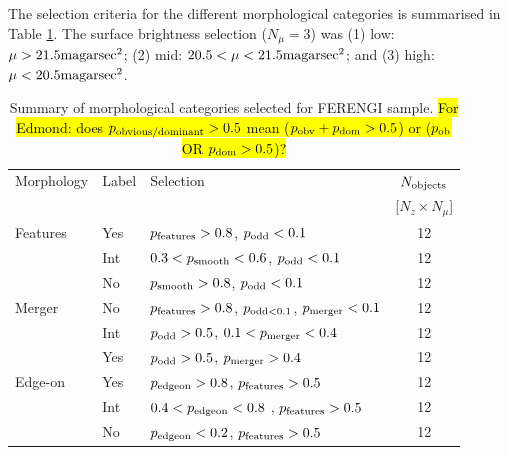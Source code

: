 \documentclass[usenatbib]{mn2e}
\begin{document}
 The selection criteria for the different morphological categories is summarised in Table \ref{morphologies}. The surface brightness selection ($N_\mu = 3$) was (1) low: $\mu > 21.5 {\rm mag arsec}^2$;  (2) mid: $20.5 < \mu < 21.5 {\rm mag arsec}^2$; and (3) high: $\mu < 20.5 {\rm mag arsec}^2$. 
 
\begin{table}
\caption{Summary of morphological categories selected for FERENGI sample. \hl{For Edmond: does $p_{\rm obvious/dominant}>0.5$ mean ($p_{\rm obv}+p_{\rm dom}>0.5$) or ($p_{\rm ob}$ OR $p_{\rm dom} >0.5$)?}\label{morphologies}}
\begin{tabular}{lllc}
\hline\hline
Morphology          & Label &  Selection                                                                                            & $N_{\rm objects}$ \\
                    &       &                                                                                                       & [$N_z \times N_\mu$] \\
\hline
Features            & Yes   & $p_{\rm features} > 0.8$, $p_{\rm odd} < 0.1$                                                         & 12 \\ 
                    & Int   & $0.3 < p_{\rm smooth} < 0.6$, $p_{\rm odd} < 0.1$                                                     & 12 \\ 
                    & No    & $p_{\rm smooth} > 0.8$, $p_{\rm odd} < 0.1$                                                           & 12 \\ 
Merger              & No    & $p_{\rm features} > 0.8$, $p_{\rm odd < 0.1}$, $p_{\rm merger} < 0.1$                                 & 12 \\
                    & Int   & $p_{\rm odd} > 0.5$, $0.1< p_{\rm merger} < 0.4$                                                      & 12 \\ 
                    & Yes   & $p_{\rm odd} > 0.5$, $p_{\rm merger} > 0.4$                                                           & 12 \\
Edge-on             & Yes   & $p_{\rm edgeon} > 0.8$, $p_{\rm features} > 0.5$                                                      & 12 \\
                    & Int   & $0.4 < p_{\rm edgeon} < 0.8$ , $p_{\rm features} > 0.5$                                               & 12 \\
                    & No    & $p_{\rm edgeon} < 0.2$, $p_{\rm features} > 0.5$                                                      & 12 \\

\end{tabular}
\end{table}
\end{document}
